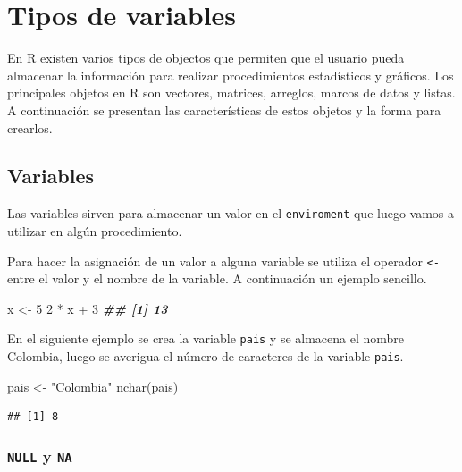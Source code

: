 \documentclass[
]{book}
\newenvironment{Shaded}{\begin{snugshade}}{\end{snugshade}}
\newcommand{\DecValTok}[1]{\textcolor[rgb]{0.00,0.00,0.81}{#1}}
\newcommand{\DocumentationTok}[1]{\textcolor[rgb]{0.56,0.35,0.01}{\textbf{\textit{#1}}}}
\newcommand{\FunctionTok}[1]{\textcolor[rgb]{0.00,0.00,0.00}{#1}}
\newcommand{\NormalTok}[1]{#1}
\newcommand{\OtherTok}[1]{\textcolor[rgb]{0.56,0.35,0.01}{#1}}
\newcommand{\SpecialCharTok}[1]{\textcolor[rgb]{0.00,0.00,0.00}{#1}}
\newcommand{\StringTok}[1]{\textcolor[rgb]{0.31,0.60,0.02}{#1}}
\begin{document}
\hypertarget{objetos}{%
\chapter{Tipos de variables}\label{objetos}}

En R existen varios tipos de objectos que permiten que el usuario pueda almacenar la información para realizar procedimientos estadísticos y gráficos. Los principales objetos en R son vectores, matrices, arreglos, marcos de datos y listas. A continuación se presentan las características de estos objetos y la forma para crearlos.

\hypertarget{variables}{%
\section{Variables}\label{variables}}

Las variables sirven para almacenar un valor en el \texttt{enviroment} que luego vamos a utilizar en algún procedimiento.

Para hacer la asignación de un valor a alguna variable se utiliza el operador \texttt{\textless{}-} entre el valor y el nombre de la variable. A continuación un ejemplo sencillo.

\begin{Shaded}
\begin{Highlighting}[]
\NormalTok{x }\OtherTok{\textless{}{-}} \DecValTok{5}
\DecValTok{2} \SpecialCharTok{*}\NormalTok{ x }\SpecialCharTok{+} \DecValTok{3}
\DocumentationTok{\#\# [1] 13}
\end{Highlighting}
\end{Shaded}

En el siguiente ejemplo se crea la variable \texttt{pais} y se almacena el nombre Colombia, luego se averigua el número de caracteres de la variable \texttt{pais}.

\begin{Shaded}
\begin{Highlighting}[]
\NormalTok{pais }\OtherTok{\textless{}{-}} \StringTok{"Colombia"}
\FunctionTok{nchar}\NormalTok{(pais)}
\end{Highlighting}
\end{Shaded}

\begin{verbatim}
## [1] 8
\end{verbatim}

\hypertarget{null-y-na}{%
\subsection{\texorpdfstring{\texttt{NULL} y \texttt{NA}}{NULL y NA}}\label{null-y-na}}
\end{document}
